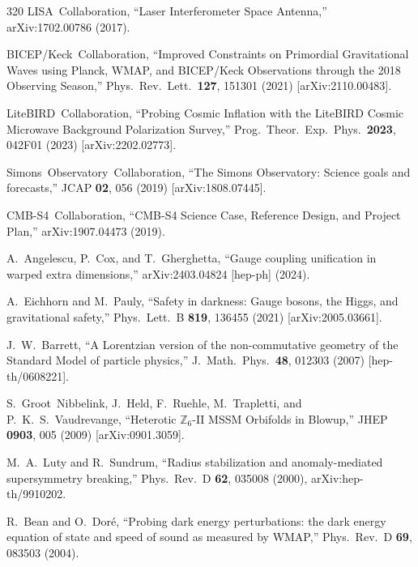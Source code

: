 \begin{thebibliography}{320}
LISA~Collaboration,
``Laser Interferometer Space Antenna,''
arXiv:1702.00786 (2017).

BICEP/Keck~Collaboration,
``Improved Constraints on Primordial Gravitational Waves using Planck, WMAP, and BICEP/Keck Observations through the 2018 Observing Season,''
Phys.\ Rev.\ Lett.\ \textbf{127}, 151301 (2021)
[arXiv:2110.00483].

LiteBIRD~Collaboration,
``Probing Cosmic Inflation with the LiteBIRD Cosmic Microwave Background Polarization Survey,''
Prog.\ Theor.\ Exp.\ Phys.\ \textbf{2023}, 042F01 (2023)
[arXiv:2202.02773].

Simons~Observatory~Collaboration,
``The Simons Observatory: Science goals and forecasts,''
JCAP \textbf{02}, 056 (2019)
[arXiv:1808.07445].

CMB-S4~Collaboration,
``CMB-S4 Science Case, Reference Design, and Project Plan,''
arXiv:1907.04473 (2019).

A.~Angelescu, P.~Cox, and T.~Gherghetta,
``Gauge coupling unification in warped extra dimensions,''
arXiv:2403.04824 [hep-ph] (2024).

A.~Eichhorn and M.~Pauly,
``Safety in darkness: Gauge bosons, the Higgs, and gravitational safety,''
Phys.\ Lett.\ B \textbf{819}, 136455 (2021)
[arXiv:2005.03661].

J.~W.~Barrett,
``A Lorentzian version of the non-commutative geometry of the Standard Model of particle physics,''
J.\ Math.\ Phys.\ \textbf{48}, 012303 (2007)
[hep-th/0608221].

S.~Groot~Nibbelink, J.~Held, F.~Ruehle, M.~Trapletti, and P.~K.~S.~Vaudrevange,
``Heterotic $\mathbb{Z}_6$-II MSSM Orbifolds in Blowup,''
JHEP \textbf{0903}, 005 (2009)
[arXiv:0901.3059].


M.~A.~Luty and R.~Sundrum,
``Radius stabilization and anomaly-mediated supersymmetry breaking,''
Phys.\ Rev.\ D \textbf{62}, 035008 (2000),
arXiv:hep-th/9910202.


R.~Bean and O.~Dor\'{e},
``Probing dark energy perturbations: the dark energy equation of state and speed of sound as measured by WMAP,''
Phys.\ Rev.\ D \textbf{69}, 083503 (2004).


\end{thebibliography}
